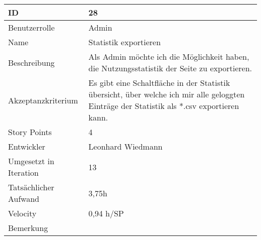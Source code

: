 \begin{tabularx}{\textwidth}{|p{}|X|}
	\hline
	ID & 28 \\
	\hline
	Benutzerrolle & Admin \\
	\hline
	Name & Statistik exportieren\\
	\hline
	Beschreibung & Als Admin möchte ich die Möglichkeit haben, die Nutzungsstatistik der Seite zu exportieren. \\
	\hline
	Akzeptanzkriterium & Es gibt eine Schaltfläche in der Statistik übersicht, über welche ich mir alle geloggten Einträge der Statistik als *.csv exportieren kann. \\
	\hline
	Story Points & 4 \\
	\hline
	Entwickler & Leonhard Wiedmann \\
	\hline
	Umgesetzt in Iteration & 13 \\
	\hline
	Tatsächlicher Aufwand & 3,75h \\
	\hline
	Velocity & 0,94 h/SP\\
	\hline
	Bemerkung & \\
	\hline
\end{tabularx}
\vspace{20pt}
